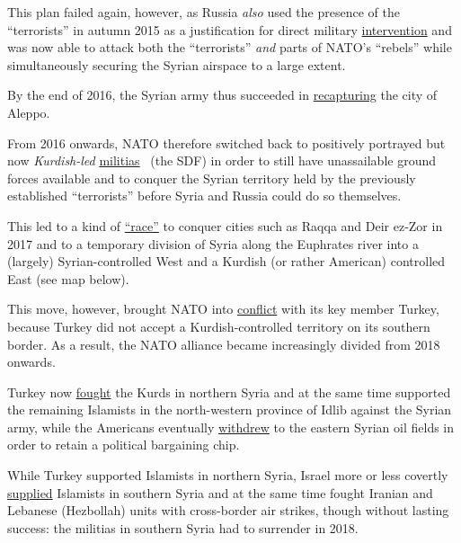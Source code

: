 This plan failed again, however, as Russia \emph{also} used the presence
of the ``terrorists'' in autumn 2015 as a justification for direct
military
\href{https://en.wikipedia.org/wiki/Russian_military_intervention_in_the_Syrian_Civil_War}{intervention}
and was now able to attack both the ``terrorists'' \emph{and} parts of
NATO's ``rebels'' while simultaneously securing the Syrian airspace to a
large extent.

By the end of 2016, the Syrian army thus succeeded in
\href{https://en.wikipedia.org/wiki/Battle_of_Aleppo_(2012\%E2\%80\%932016)}{recapturing}
the city of Aleppo.

From 2016 onwards, NATO therefore switched back to positively portrayed
but now \emph{Kurdish-led}
\href{https://en.wikipedia.org/wiki/Syrian_Democratic_Forces}{militias}~
(the SDF) in order to still have unassailable ground forces available
and to conquer the Syrian territory held by the previously established
``terrorists'' before Syria and Russia could do so themselves.

This led to a kind of
\href{https://www.economist.com/middle-east-and-africa/2017/03/23/the-noose-is-tightening-in-syria}{``race''}
to conquer cities such as Raqqa and Deir ez-Zor in 2017 and to a
temporary division of Syria along the Euphrates river into a (largely)
Syrian-controlled West and a Kurdish (or rather American) controlled
East (see map below).

This move, however, brought NATO into
\href{https://www.dw.com/en/nato-allies-clash-as-turkey-attacks-us-backed-kurds-in-syria/a-42262543}{conflict}
with its key member Turkey, because Turkey did not accept a
Kurdish-controlled territory on its southern border. As a result, the
NATO alliance became increasingly divided from 2018 onwards.

Turkey now
\href{https://en.wikipedia.org/wiki/Turkish_occupation_of_northern_Syria}{fought}
the Kurds in northern Syria and at the same time supported the remaining
Islamists in the north-western province of Idlib against the Syrian
army, while the Americans eventually
\href{https://www.france24.com/en/20191026-after-abandoning-kurds-us-to-send-troops-to-syria-oil-fields}{withdrew}
to the eastern Syrian oil fields in order to retain a political
bargaining chip.

While Turkey supported Islamists in northern Syria, Israel more or less
covertly
\href{https://www.jpost.com/Middle-East/Report-Israel-treating-al-Qaida-fighters-wounded-in-Syria-civil-war-393862}{supplied}
Islamists in southern Syria and at the same time fought Iranian and
Lebanese (Hezbollah) units with cross-border air strikes, though without
lasting success: the militias in southern Syria had to surrender in
2018.

